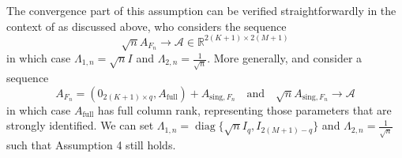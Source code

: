 \documentclass[11pt]{article}
\theoremstyle{definition}
\DeclareMathOperator*{\diag}{diag}
\newcommand{\R}{\ensuremath{\mathbb{R}}}
\newcommand{\0}{\ensuremath{\mathbf{0}}}
\begin{document}
\begin{bibunit}
The convergence part of this assumption can be verified straightforwardly in the context of \cite{kleibergen:2005} as discussed above, who considers the sequence
\begin{equation}
\label{eq:A_shrink}
	\sqrt{n}A_{F_n} \to \mathcal{A} \in \R^{2(K+1)\times 2(M+1)}
\end{equation}
in which case $\Lambda_{1,n} = \sqrt{n}I$ and $\Lambda_{2,n} = \frac{1}{\sqrt{n}}$. More generally, \cite{stock/wright:2000} and \cite{chaudhuri/zivot:2011} consider a sequence
\begin{equation}
\label{eq:A_shrink_2}
	A_{F_n} = (0_{2(K+1)\times q}, A_{\text{full}}) + A_{\text{sing},F_n} \quad \text{and} \quad \sqrt{n}A_{\text{sing},F_n} \to \mathcal{A}
\end{equation}
in which case $A_{\text{full}}$ has full column rank, representing those parameters that are strongly identified. We can set $\Lambda_{1,n} = \diag\{\sqrt{n}I_{q},I_{2(M+1) - q}\}$ and $\Lambda_{2,n} = \frac{1}{\sqrt{n}}$ such that Assumption 4 still holds.


\end{bibunit}
\end{document}
